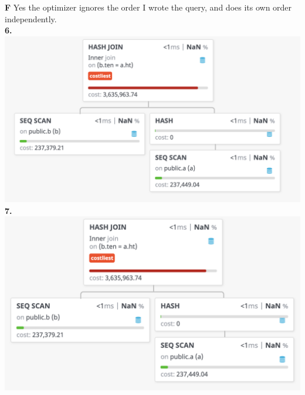 \documentclass[12pt, letterpaper, fleqn]{article}
\begin{document}
  \textbf{F} Yes the optimizer ignores the order I wrote the query, and does its
  own order independently. \\
  \textbf{6. }\\
  \includegraphics[scale=0.5]{query_pics/6.png} \\
  \textbf{7. }\\
  \includegraphics[scale=0.5]{query_pics/7.png} \\\\
\end{document}
